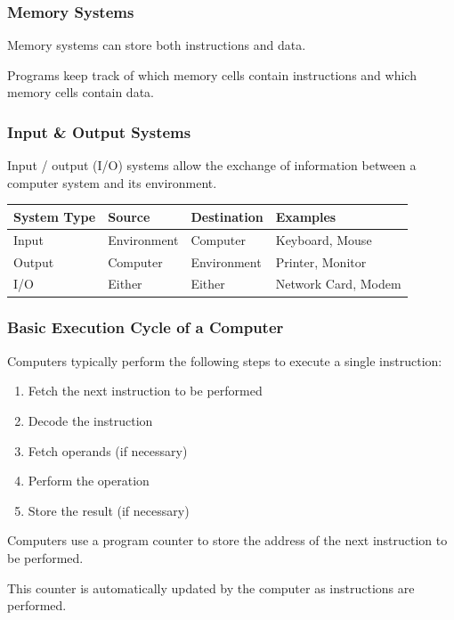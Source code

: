 \begin{frame}
\frametitle{Memory Systems}

Memory systems can store both instructions and data.

Programs keep track of which memory cells contain instructions and which memory cells contain data.

\end{frame}

\begin{frame}
\frametitle{Input \& Output Systems}

\alert{Input / output (I/O)} systems allow the exchange of information between a computer system and its environment.

\begin{center}
\begin{tabular}{l l l l}
	\textbf{System Type} & \textbf{Source} & \textbf{Destination} & \textbf{Examples} \\ \hline
	Input & Environment & Computer & Keyboard, Mouse \\
	Output & Computer & Environment & Printer, Monitor\\
	I/O & Either & Either & Network Card, Modem\\
	\end{tabular}
\end{center}

\end{frame}

\begin{frame}
\frametitle{Basic Execution Cycle of a Computer}

Computers typically perform the following steps to execute a single instruction:
\begin{enumerate}
	\item Fetch the next instruction to be performed
	\item Decode the instruction
	\item Fetch operands (if necessary)
	\item Perform the operation
	\item Store the result (if necessary)
\end{enumerate}

Computers use a \alert{program counter} to store the address of the next instruction to be performed.

This counter is automatically updated by the computer as instructions are performed.


\end{frame}

